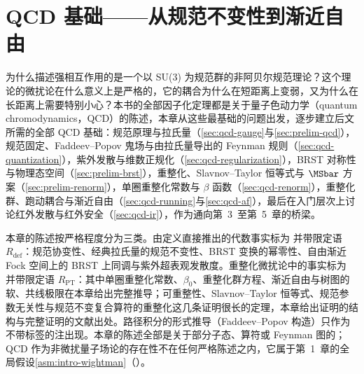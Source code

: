 \chapter{QCD 基础——从规范不变性到渐近自由}\label{ch:qcd}

为什么描述强相互作用的是一个以 SU(3) 为规范群的非阿贝尔规范理论？这个理论的微扰论在什么意义上是严格的，它的耦合为什么在短距离上变弱，又为什么在长距离上需要特别小心？本书的全部因子化定理都是关于量子色动力学（quantum chromodynamics，QCD）的陈述，本章从这些最基础的问题出发，逐步建立后文所需的全部 QCD 基础：规范原理与拉氏量（\cref{sec:qcd-gauge}与\cref{sec:prelim-qcd}），规范固定、Faddeev--Popov 鬼场与由拉氏量导出的 Feynman 规则（\cref{sec:qcd-quantization}），紫外发散与维数正规化（\cref{sec:qcd-regularization}），BRST 对称性与物理态空间（\cref{sec:prelim-brst}），重整化、Slavnov--Taylor 恒等式与 $\MSbar$ 方案（\cref{sec:prelim-renorm}），单圈重整化常数与 $\beta$ 函数（\cref{sec:qcd-renorm}），重整化群、跑动耦合与渐近自由（\cref{sec:qcd-running}与\cref{sec:qcd-af}），最后在入门层次上讨论红外发散与红外安全（\cref{sec:qcd-ir}），作为通向第~3~至第~5~章的桥梁。

本章的陈述按严格程度分为三类。由定义直接推出的代数事实标为 \tagR 并带限定语 $R_{\mathrm{def}}$：规范协变性、经典拉氏量的规范不变性、BRST 变换的幂零性、自由渐近 Fock 空间上的 BRST 上同调与紫外超表观发散度。重整化微扰论中的事实标为 \tagR 并带限定语 $R_{\mathrm{PT}}$：其中单圈重整化常数、$\beta_0$、重整化群方程、渐近自由与树图的软、共线极限在本章给出完整推导；可重整性、Slavnov--Taylor 恒等式、规范参数无关性与规范不变复合算符的重整化这几条证明很长的定理，本章给出证明的结构与完整证明的文献出处。路径积分的形式推导（Faddeev--Popov 构造）只作为不带标签的注出现。本章的陈述全部是关于部分子态、算符或 Feynman 图的；QCD 作为非微扰量子场论的存在性不在任何严格陈述之内，它属于第~1~章的全局假设\cref{asm:intro-wightman}（\tagC）。

